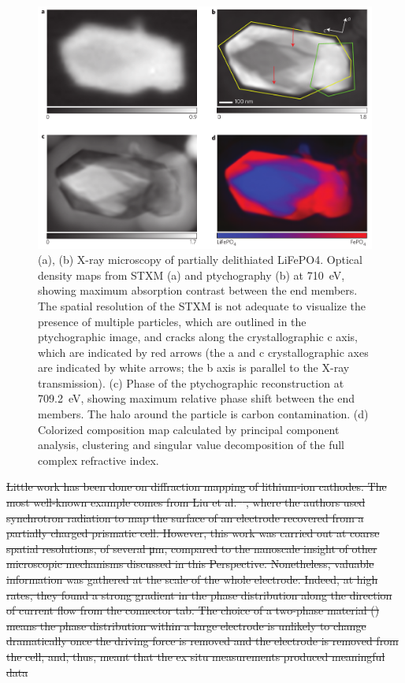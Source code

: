 \documentclass[journal=cmatex,manuscript=perspective]{achemso}
\providecommand{\DIFdeltex}[1]{{\protect\color{red}\sout{#1}}}                      %
\providecommand{\DIFdelbegin}{} %
\providecommand{\DIFdelend}{} %
\providecommand{\DIFdel}[1]{\texorpdfstring{\DIFdeltex{#1}}{}} %
\begin{document}
\begin{figure}
  \includegraphics[width=\textwidth]{shapiro2014-2.png}
  \caption{(a), (b) X-ray microscopy of partially delithiated
    LiFePO4. Optical density maps from STXM (a) and ptychography (b)
    at \SI{710}{eV}, showing maximum absorption contrast between the end
    members. The spatial resolution of the STXM is not adequate to
    visualize the presence of multiple particles, which are outlined
    in the ptychographic image, and cracks along the crystallographic
    c axis, which are indicated by red arrows (the a and c
    crystallographic axes are indicated by white arrows; the b axis is
    parallel to the X-ray transmission). (c) Phase of the
    ptychographic reconstruction at \SI{709.2}{eV}, showing maximum relative
    phase shift between the end members. The halo around the particle
    is carbon contamination. (d) Colorized composition map calculated
    by principal component analysis, clustering and singular value
    decomposition of the full complex refractive index.\cite{shapiro2014}}
  \label{figure:shapiro2014-2}
\end{figure}
\DIFdelbegin \DIFdel{Little work has been done on diffraction mapping of lithium-ion
cathodes. The most well-known example comes from Liu et
al.\mbox{%
\cite{liu2010}}%
, where the authors used synchrotron radiation to map
the surface of an electrode recovered from a partially charged
prismatic cell. However, this work was carried out at coarse spatial
resolutions, of several \si{\micro\meter}, compared to the nanoscale
insight of other microscopic mechanisms discussed in this
Perspective. Nonetheless, valuable information was gathered at the
scale of the whole electrode. Indeed, at high rates, they found a
strong gradient in the phase distribution along the direction of
current flow from the connector tab. The choice of a two-phase
material (\ce{LiFePO4}) means the phase distribution within a large
electrode is unlikely to change dramatically once the driving force is
removed and the electrode is removed from the cell, and, thus, meant
that the ex situ measurements produced meaningful data
}\DIFdelend 
\end{document}
